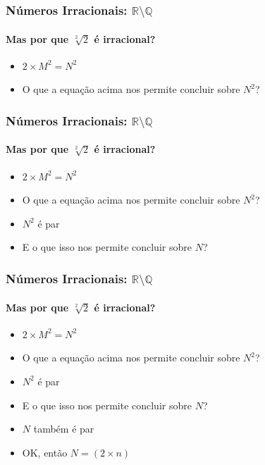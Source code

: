 \documentclass[usenames,dvipsnames,svgnames]{beamer}
\begin{document}
\begin{frame}	
	\frametitle{Números Irracionais: $\mathbb{R} \setminus \mathbb{Q}$}
	\framesubtitle{Mas {\color{red}por que} $\sqrt[2]{2}$ é irracional?}

	\begin{itemize}
		\item $2 \times M^2 = N^2$
		\item O que a equação acima nos permite concluir sobre $N^2$?
	\end{itemize}
\end{frame}

\begin{frame}	
	\frametitle{Números Irracionais: $\mathbb{R} \setminus \mathbb{Q}$}
	\framesubtitle{Mas {\color{red}por que} $\sqrt[2]{2}$ é irracional?}

	\begin{itemize}
		\item $2 \times M^2 = N^2$
		\item O que a equação acima nos permite concluir sobre $N^2$?
		\item {\color{red} $N^2$ é par}
		\item E o que isso nos permite concluir sobre $N$?
	\end{itemize}
\end{frame}

\begin{frame}	
	\frametitle{Números Irracionais: $\mathbb{R} \setminus \mathbb{Q}$}
	\framesubtitle{Mas {\color{red}por que} $\sqrt[2]{2}$ é irracional?}

	\begin{itemize}
		\item $2 \times M^2 = N^2$
		\item O que a equação acima nos permite concluir sobre $N^2$?
		\item {\color{red} $N^2$ é par}
		\item E o que isso nos permite concluir sobre $N$?
		\item {\color{red} $N$ também é par}
		\item OK, então $N = (2 \times n)$
	\end{itemize}
\end{frame}
\end{document}
